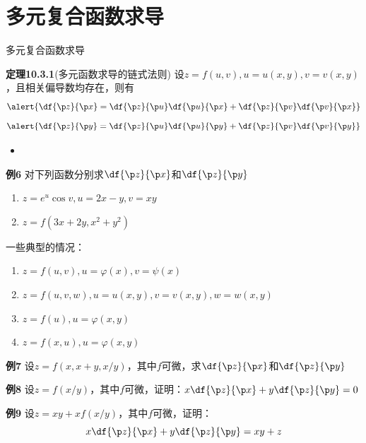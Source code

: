 \section{多元复合函数求导}

\begin{frame}{多元复合函数求导}
	\linespread{1.2}
	\begin{block}{{\bf 定理10.3.1}(多元函数求导的链式法则)\hfill}
		设$z=f(u,v),u=u(x,y),v=v(x,y)$，\pause 且相关偏导数均存在，\pause 则有
		$$\alert{\df{\p z}{\p x}=\df{\p z}{\p u}\df{\p u}{\p x}
		+\df{\p z}{\p v}\df{\p v}{\p x}}$$\pause \vspace{-1em}
		$$\alert{\df{\p z}{\p y}=\df{\p z}{\p u}\df{\p u}{\p y}
		+\df{\p z}{\p v}\df{\p v}{\p y}}$$
	\end{block}\pause 
	\begin{itemize}
	  \item {}
	\end{itemize}
\end{frame}

\begin{frame}
	\linespread{1.2}
	\begin{exampleblock}{{\bf 例6}\hfill}
		对下列函数分别求$\df{\p z}{\p x}$和$\df{\p z}{\p y}$
		\begin{enumerate}
		  \item $z=e^u\cos v,u=2x-y,v=xy$
		  \item $z=f(3x+2y,x^2+y^2)$
		\end{enumerate}
	\end{exampleblock}
\end{frame}

\begin{frame}{一些典型的情况：}
	\linespread{1.5}\pause 
	\begin{enumerate}
	  \item $z=f(u,v),u=\varphi(x),v=\psi(x)$\pause 
	  \item $z=f(u,v,w),u=u(x,y),v=v(x,y),w=w(x,y)$\pause 
	  \item $z=f(u),u=\varphi(x,y)$\pause 
	  \item $z=f(x,u),u=\varphi(x,y)$
	\end{enumerate}
\end{frame}

\begin{frame}
	\linespread{1.2}
	\begin{exampleblock}{{\bf 例7}\hfill}
		设$z=f(x,x+y,x/y)$，其中$f$可微，求$\df{\p z}{\p x}$和$\df{\p z}{\p y}$
	\end{exampleblock}\pause 
	\begin{exampleblock}{{\bf 例8}\hfill}
		设$z=f(x/y)$，其中$f$可微，证明：$x\df{\p z}{\p x}+y\df{\p z}{\p y}=0$
	\end{exampleblock}\pause 
	\begin{exampleblock}{{\bf 例9}\hfill}
		设$z=xy+xf(x/y)$，其中$f$可微，证明：
		$$x\df{\p z}{\p x}+y\df{\p z}{\p y}=xy+z$$
	\end{exampleblock}
\end{frame}

